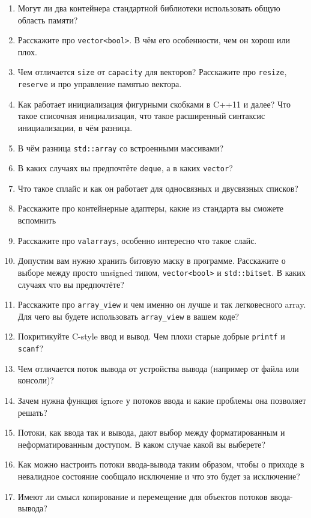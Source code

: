 \documentclass[a4paper,12pt,oneside]{book}
\begin{document}
\begin{enumerate}
\item Могут ли два контейнера стандартной библиотеки использовать общую область памяти?
\item Расскажите про \lstinline!vector<bool>!. В чём его особенности, чем он хорош или плох.
\item Чем отличается \lstinline!size! от \lstinline!capacity! для векторов? Расскажите про \lstinline!resize!, \lstinline!reserve! и про управление памятью вектора.
\item Как работает инициализация фигурными скобками в C++11 и далее? Что такое списочная инициализация, что такое расширенный синтаксис инициализации, в чём разница.
\item В чём разница \lstinline!std::array! со встроенными массивами?
\item В каких случаях вы предпочтёте \lstinline!deque!, а в каких \lstinline!vector!?
\item Что такое сплайс и как он работает для односвязных и двусвязных списков?
\item Расскажите про контейнерные адаптеры, какие из стандарта вы сможете вспомнить
\item Расскажите про \lstinline!valarrays!, особенно интересно что такое слайс.
\item Допустим вам нужно хранить битовую маску в программе. Расскажите о выборе между просто unsigned типом, \lstinline!vector<bool>! и \lstinline!std::bitset!. В каких случаях что вы предпочтёте?
\item Расскажите про \lstinline!array_view! и чем именно он лучше и так легковесного array. Для чего вы будете использовать \lstinline!array_view! в вашем коде?
%
%
\item Покритикуйте C-style ввод и вывод. Чем плохи старые добрые \lstinline!printf! и \lstinline!scanf!?
\item Чем отличается поток вывода от устройства вывода (например от файла или консоли)?
\item Зачем нужна функция ignore у потоков ввода и какие проблемы она позволяет решать?
\item Потоки, как ввода так и вывода, дают выбор между форматированным и неформатированным доступом. В каком случае какой вы выберете?
\item Как можно настроить потоки ввода-вывода таким образом, чтобы о приходе в невалидное состояние сообщало исключение и что это будет за исключение?
\item Имеют ли смысл копирование и перемещение для объектов потоков ввода-вывода?

\end{enumerate}
\end{document}
